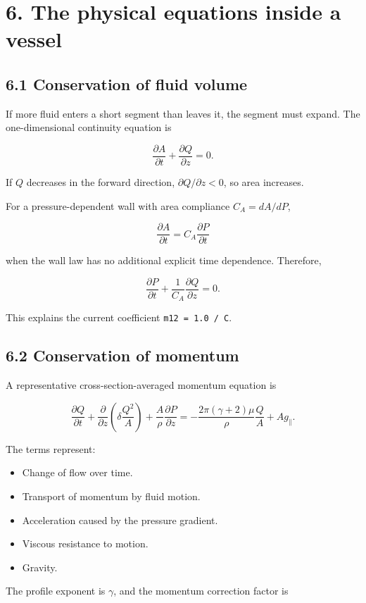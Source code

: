 \documentclass[11pt,a4paper]{article}
\begin{document}
\section{6. The physical equations inside a vessel}
\subsection{6.1 Conservation of fluid volume}
If more fluid enters a short segment than leaves it, the segment must expand. The one-dimensional continuity equation is


\begingroup\small
\[
\frac{\partial A}{\partial t}
+\frac{\partial Q}{\partial z}=0.
\]
\endgroup


If \(Q\) decreases in the forward direction, \(\partial Q/\partial z<0\), so area increases.

For a pressure-dependent wall with area compliance \(C_A=dA/dP\),


\begingroup\small
\[
\frac{\partial A}{\partial t}
=C_A\frac{\partial P}{\partial t}
\]
\endgroup


when the wall law has no additional explicit time dependence. Therefore,


\begingroup\small
\[
\frac{\partial P}{\partial t}
+\frac1{C_A}\frac{\partial Q}{\partial z}=0.
\]
\endgroup


This explains the current coefficient \texttt{m12 = 1.\allowbreak{}0 /\allowbreak{} C}.

\subsection{6.2 Conservation of momentum}
A representative cross-section-averaged momentum equation is


\begingroup\small
\[
\frac{\partial Q}{\partial t}
+\frac{\partial}{\partial z}
\left(\delta\frac{Q^2}{A}\right)
+\frac A\rho\frac{\partial P}{\partial z}
=
-\frac{2\pi(\gamma+2)\mu}{\rho}\frac QA
+A g_\parallel.
\]
\endgroup


The terms represent:


\begin{itemize}
\item Change of flow over time.


\item Transport of momentum by fluid motion.


\item Acceleration caused by the pressure gradient.


\item Viscous resistance to motion.


\item Gravity.


\end{itemize}
The profile exponent is \(\gamma\), and the momentum correction factor is
\end{document}
